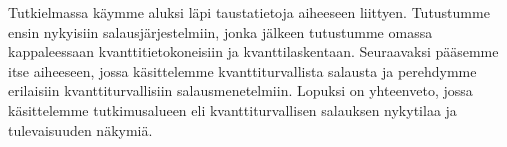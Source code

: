 Tutkielmassa käymme aluksi läpi taustatietoja aiheeseen liittyen. Tutustumme ensin nykyisiin salausjärjestelmiin, jonka jälkeen tutustumme omassa kappaleessaan kvanttitietokoneisiin ja kvanttilaskentaan. Seuraavaksi pääsemme itse aiheeseen, jossa käsittelemme kvanttiturvallista salausta ja perehdymme erilaisiin kvanttiturvallisiin salausmenetelmiin. Lopuksi on yhteenveto, jossa käsittelemme tutkimusalueen eli kvanttiturvallisen salauksen nykytilaa ja tulevaisuuden näkymiä.